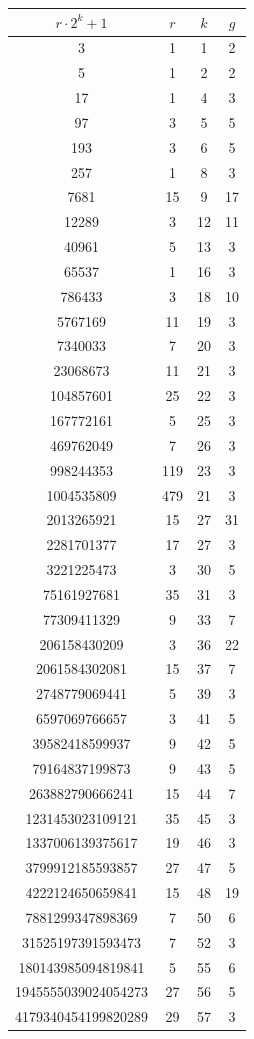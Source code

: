 \documentclass[twoside]{article}
\begin{document}
\begin{enumerate}
\begin{tabular}{cccc}
    \hline
    $r⋅2^k+1$&$r$&$k$&$g$\\
    \hline
    3&1&1&2\\
    5&1&2&2\\
    17&1&4&3\\
    97&3&5&5\\
    193&3&6&5\\
    257&1&8&3\\
    7681&15&9&17\\
    12289&3&12&11\\
    40961&5&13&3\\
    65537&1&16&3\\
    786433&3&18&10\\
    5767169&11&19&3\\
    7340033&7&20&3\\
    23068673&11&21&3\\
    104857601&25&22&3\\
    167772161&5&25&3\\
    469762049&7&26&3\\
    998244353&119&23&3\\
    1004535809&479&21&3\\
    2013265921&15&27&31\\
    2281701377&17&27&3\\
    3221225473&3&30&5\\
    75161927681&35&31&3\\
    77309411329&9&33&7\\
    206158430209&3&36&22\\
    2061584302081&15&37&7\\
    2748779069441&5&39&3\\
    6597069766657&3&41&5\\
    39582418599937&9&42&5\\
    79164837199873&9&43&5\\
    263882790666241&15&44&7\\
    1231453023109121&35&45&3\\
    1337006139375617&19&46&3\\
    3799912185593857&27&47&5\\
    4222124650659841&15&48&19\\
    7881299347898369&7&50&6\\
    31525197391593473&7&52&3\\
    180143985094819841&5&55&6\\
    1945555039024054273&27&56&5\\
    4179340454199820289&29&57&3\\
    \hline
\end{tabular}

\end{enumerate}
\clearpage
\end{document}
